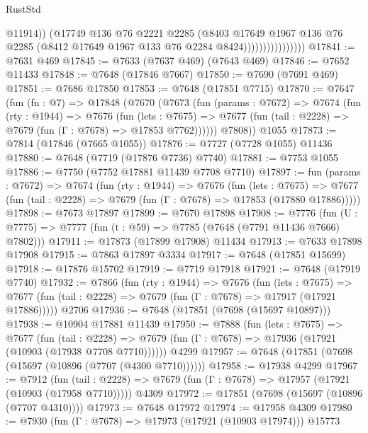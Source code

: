 \begin{lexlean}{RustStd}
\begin{coremodule}
                                  @11914))
                              (@17749
                                @136
                                @76
                                @2221
                                @2285
                                (@8403
                                  @17649
                                  @1967
                                  @136
                                  @76
                                  @2285
                                  (@8412 @17649 @1967 @133 @76 @2284 @8424))))))))))))))))
@17841 := @7631 @469
@17845 := @7633 (@7637 @469) (@7643 @469)
@17846 := @7652 @11433
@17848 := @7648 (@17846 @7667)
@17850 := @7690 (@7691 @469)
@17851 := @7686 @17850
@17853 := @7648 (@17851 @7715)
@17870 := @7647
    (fun (fn : @7) =>
    @17848
      (@7670
        (@7673
          (fun (params : @7672) =>
          @7674
            (fun (rty : @1944) =>
            @7676
              (fun (lets : @7675) =>
              @7677 (fun (tail : @2228) => @7679 (fun (Γ : @7678) => @17853 @7762))))))
        @7808))
    @1055
@17873 := @7814 (@17846 (@7665 @1055))
@17876 := @7727 (@7728 @1055) @11436
@17880 := @7648 (@7719 (@17876 @7736) @7740)
@17881 := @7753 @1055
@17886 := @7750 (@7752 @17881 @11439 @7708 @7710)
@17897 := fun (params : @7672) =>
  @7674
    (fun (rty : @1944) =>
    @7676
      (fun (lets : @7675) =>
      @7677 (fun (tail : @2228) => @7679 (fun (Γ : @7678) => @17853 (@17880 @17886)))))
@17898 := @7673 @17897
@17899 := @7670 @17898
@17908 := @7776
    (fun (U : @7775) => @7777 (fun (t : @59) => @7785 (@7648 (@7791 @11436 @7666) @7802)))
@17911 := @17873 (@17899 @17908) @11434
@17913 := @7633 @17898 @17908
@17915 := @7863 @17897 @3334
@17917 := @7648 (@17851 @15699)
@17918 := @17876 @15702
@17919 := @7719 @17918
@17921 := @7648 (@17919 @7740)
@17932 := @7866
    (fun (rty : @1944) =>
    @7676
      (fun (lets : @7675) =>
      @7677 (fun (tail : @2228) => @7679 (fun (Γ : @7678) => @17917 (@17921 @17886)))))
    @2706
@17936 := @7648 (@17851 (@7698 (@15697 @10897)))
@17938 := @10904 @17881 @11439
@17950 := @7888
    (fun (lets : @7675) =>
    @7677
      (fun (tail : @2228) =>
      @7679 (fun (Γ : @7678) => @17936 (@17921 (@10903 (@17938 @7708 @7710))))))
    @4299
@17957 := @7648 (@17851 (@7698 (@15697 (@10896 (@7707 (@4300 @7710))))))
@17958 := @17938 @4299
@17967 := @7912
    (fun (tail : @2228) => @7679 (fun (Γ : @7678) => @17957 (@17921 (@10903 (@17958 @7710)))))
    @4309
@17972 := @17851 (@7698 (@15697 (@10896 (@7707 @4310))))
@17973 := @7648 @17972
@17974 := @17958 @4309
@17980 := @7930 (fun (Γ : @7678) => @17973 (@17921 (@10903 @17974))) @15773

\end{coremodule}
\end{lexlean}
